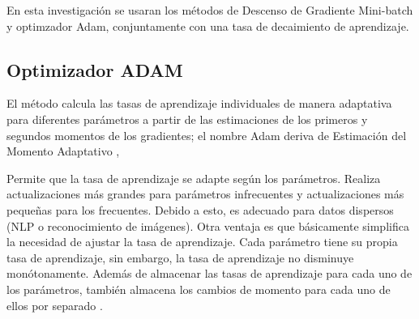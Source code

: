 
		En esta investigación se usaran los métodos de Descenso de Gradiente Mini-batch y optimzador Adam, conjuntamente con una tasa de decaimiento de aprendizaje.

	\subsection{Optimizador ADAM}
	
		El método calcula las tasas de aprendizaje individuales de manera adaptativa para diferentes parámetros a partir de las estimaciones de los primeros y segundos momentos de los gradientes; el nombre Adam deriva de Estimación del Momento Adaptativo \citep {Adam},

		Permite que la tasa de aprendizaje se adapte según los parámetros. Realiza actualizaciones más grandes para parámetros infrecuentes y actualizaciones más pequeñas para los frecuentes. Debido a esto, es adecuado para datos dispersos (NLP o reconocimiento de imágenes). Otra ventaja es que básicamente simplifica la necesidad de ajustar la tasa de aprendizaje. Cada parámetro tiene su propia tasa de aprendizaje, sin embargo, la tasa de aprendizaje no disminuye monótonamente. Además de almacenar las tasas de aprendizaje para cada uno de los parámetros, también almacena los cambios de momento para cada uno de ellos por separado .

